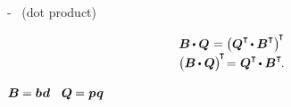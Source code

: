 \dotproductinquotes\hbox{-}~%
(dot product)

\nopagebreak\vspace{-0.2em}
\begin{equation}\label{transposeofdotproductforbivalenttensors}
\begin{array}{c}
\bm{B} \hspace{-0.1ex} \dotp \bm{Q} \hspace{.1ex} = \bigl( \bm{Q}^{\T} \hspace{-0.2ex}\dotp \bm{B}^{\T} \bigr)^{\hspace{-0.25ex}\T}
\\[.1em]
\bigl( \bm{B} \hspace{-0.1ex} \dotp \bm{Q} \bigr)^{\hspace{-0.25ex}\T} \hspace{-0.4ex} = \hspace{.1ex} \bm{Q}^{\T} \hspace{-0.2ex}\dotp \bm{B}^{\T}
\hspace{-0.2ex} .
\end{array}
\end{equation}

\noindent
{}
${\bm{B} \hspace{-0.1ex} = \bm{b} \hspace{.1ex} \bm{d}}$
~${\bm{Q} \hspace{-0.1ex} = \bm{p} \hspace{.1ex} \bm{q}}$

